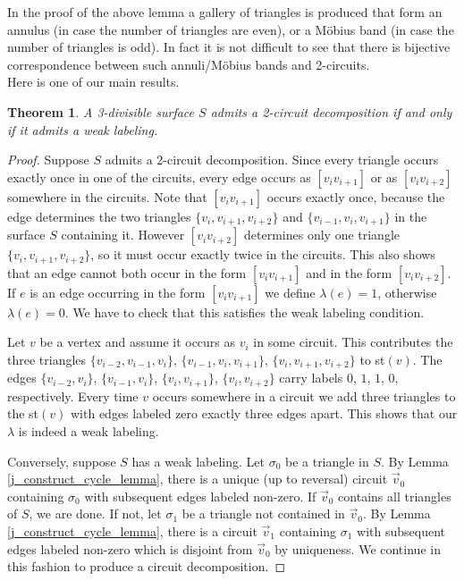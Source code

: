 \documentclass[12pt]{article}
\newtheorem{theorem}{Theorem}
\theoremstyle{definition}
\begin{document}
In the proof of the above lemma a gallery of triangles is produced that form an annulus (in case the number of triangles are even), or a M\"obius band (in case the number of triangles is odd). In fact it is not difficult to see that there is bijective correspondence between such annuli/M\"obius bands and 2-circuits.\\
    
Here is one of our main results.

\begin{theorem}\label{j_decomp_theorem}
    A 3-divisible surface $S$ admits a 2-circuit decomposition if and only if it admits a weak labeling. 
\end{theorem}

\begin{proof} 
    Suppose $S$ admits a 2-circuit decomposition. Since every triangle occurs exactly once in one of the circuits, every edge occurs as $[v_iv_{i+1}]$ or as $[v_iv_{i+2}]$ somewhere in the circuits. Note that $[v_iv_{i+1}]$ occurs exactly once, because the edge determines the two triangles $\{v_i,v_{i+1},v_{i+2}\}$ and $\{v_{i-1},v_i,v_{i+1}\}$ in the surface $S$ containing it. However $[v_iv_{i+2}]$ determines only one triangle $\{v_i,v_{i+1},v_{i+2}\}$, so it must occur exactly twice in the circuits. This also shows that an edge cannot both occur in the form $[v_iv_{i+1}]$ and in the form $[v_iv_{i+2}]$. If $e$ is an edge occurring in the form $[v_iv_{i+1}]$ we define $\lambda(e)=1$, otherwise $\lambda(e)=0$. We have to check that this satisfies the weak labeling condition.
    
    Let $v$ be a vertex and assume it occurs as $v_i$ in some circuit. This contributes the three triangles $\{ v_{i-2}, v_{i-1}, v_i\}$, $\{ v_{i-1}, v_{i}, v_{i+1}\}$, $\{ v_{i}, v_{i+1}, v_{i+2}\}$ to st$(v)$. The edges $\{ v_{i-2}, v_{i}\}$, $\{ v_{i-1}, v_{i}\}$, $\{ v_{i}, v_{i+1}\}$, $\{ v_{i}, v_{i+2}\}$ carry labels $0$, $1$, $1$, $0$, respectively. Every time $v$ occurs somewhere in a circuit we add three triangles to the st$(v)$ with edges labeled zero exactly three edges apart. This shows that our $\lambda$ is indeed a weak labeling.
        
    Conversely, suppose $S$ has a weak labeling. Let $\sigma_0$ be a triangle in $S$. By Lemma \ref{j_construct_cycle_lemma}, there is a unique (up to reversal) circuit $\vec v_0$ containing $\sigma_0$ with subsequent edges labeled non-zero. If $\vec v_0$ contains all triangles of $S$, we are done. If not, let $\sigma_1$ be a triangle not contained in $\vec v_0$. By Lemma \ref{j_construct_cycle_lemma}, there is a circuit $\vec v_1$ containing $\sigma_1$ with subsequent edges labeled non-zero which is disjoint from $\vec v_0$ by uniqueness. We continue in this fashion to produce a circuit decomposition. 
\end{proof}
\end{document}
